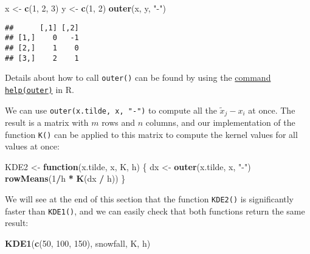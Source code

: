 \documentclass[
  a4paper,
]{article}
\newenvironment{Shaded}{\begin{snugshade}}{\end{snugshade}}
\newcommand{\ControlFlowTok}[1]{\textcolor[rgb]{0.13,0.29,0.53}{\textbf{#1}}}
\newcommand{\DecValTok}[1]{\textcolor[rgb]{0.00,0.00,0.81}{#1}}
\newcommand{\FunctionTok}[1]{\textcolor[rgb]{0.13,0.29,0.53}{\textbf{#1}}}
\newcommand{\NormalTok}[1]{#1}
\newcommand{\OtherTok}[1]{\textcolor[rgb]{0.56,0.35,0.01}{#1}}
\newcommand{\SpecialCharTok}[1]{\textcolor[rgb]{0.81,0.36,0.00}{\textbf{#1}}}
\newcommand{\StringTok}[1]{\textcolor[rgb]{0.31,0.60,0.02}{#1}}
\theoremstyle{definition}
\theoremstyle{definition}
\theoremstyle{definition}
\theoremstyle{definition}
\theoremstyle{remark}
\begin{document}
\begin{Shaded}
\begin{Highlighting}[]
\NormalTok{x }\OtherTok{\textless{}{-}} \FunctionTok{c}\NormalTok{(}\DecValTok{1}\NormalTok{, }\DecValTok{2}\NormalTok{, }\DecValTok{3}\NormalTok{)}
\NormalTok{y }\OtherTok{\textless{}{-}} \FunctionTok{c}\NormalTok{(}\DecValTok{1}\NormalTok{, }\DecValTok{2}\NormalTok{)}
\FunctionTok{outer}\NormalTok{(x, y, }\StringTok{"{-}"}\NormalTok{)}
\end{Highlighting}
\end{Shaded}

\begin{verbatim}
##      [,1] [,2]
## [1,]    0   -1
## [2,]    1    0
## [3,]    2    1
\end{verbatim}

Details about how to call \texttt{outer()} can be found by using the
\href{https://rdrr.io/r/base/outer.html}{command \texttt{help(outer)}} in R.

We can use \texttt{outer(x.tilde,\ x,\ "-")} to compute all the \(\tilde x_j - x_i\)
at once. The result is a matrix with \(m\) rows and \(n\) columns, and
our implementation of the function \texttt{K()} can be applied to this matrix
to compute the kernel values for all values at once:

\begin{Shaded}
\begin{Highlighting}[]
\NormalTok{KDE2 }\OtherTok{\textless{}{-}} \ControlFlowTok{function}\NormalTok{(x.tilde, x, K, h) \{}
\NormalTok{  dx }\OtherTok{\textless{}{-}} \FunctionTok{outer}\NormalTok{(x.tilde, x, }\StringTok{"{-}"}\NormalTok{)}
  \FunctionTok{rowMeans}\NormalTok{(}\DecValTok{1}\SpecialCharTok{/}\NormalTok{h }\SpecialCharTok{*} \FunctionTok{K}\NormalTok{(dx }\SpecialCharTok{/}\NormalTok{ h))}
\NormalTok{\}}
\end{Highlighting}
\end{Shaded}

We will see at the end of this section that the function \texttt{KDE2()} is
significantly faster than \texttt{KDE1()}, and we can easily check that both
functions return the same result:

\begin{Shaded}
\begin{Highlighting}[]
\FunctionTok{KDE1}\NormalTok{(}\FunctionTok{c}\NormalTok{(}\DecValTok{50}\NormalTok{, }\DecValTok{100}\NormalTok{, }\DecValTok{150}\NormalTok{), snowfall, K, h)}
\end{Highlighting}
\end{Shaded}
\end{document}
